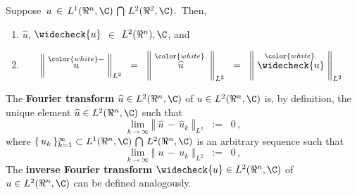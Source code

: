\vskip 0.5cm
\begin{theorem}
\mbox{}
\vskip 0.1cm
\noindent
Suppose \,$u \,\in\, L^{1}(\Re^{n},\C) \,\bigcap\, L^{2}(\Re^{2},\C)$.\,
Then,
\begin{enumerate}
\item
	$\widehat{u}$, $\widecheck{u}$ $\in$ $L^{2}(\Re^{n}),\C$, and
\item
	\begin{equation*}
	\left\Vert\;\overset{{\color{white}-}}{u}\;\right\Vert_{L^{2}}
	\;\; = \;\;
		\left\Vert\;\overset{{\color{white}.}}{\widehat{u}}\;\right\Vert_{L^{2}}
	\;\; = \;\;
		\left\Vert\;\overset{{\color{white}.}}{\widecheck{u}}\;\right\Vert_{L^{2}}
	\end{equation*}
\end{enumerate}
\end{theorem}

\vskip 0.5cm
\begin{definition}
\mbox{}
\vskip 0.1cm
\noindent
The \textbf{Fourier transform} $\widehat{u} \in L^{2}(\Re^{n},\C)$ of $u \in L^{2}(\Re^{n},\C)$ is, by definition,
the unique element $\widehat{u} \in L^{2}(\Re^{n},\C)$ such that
\begin{equation*}
\underset{k \rightarrow\infty}{\lim} \left\Vert\; \widehat{u} \,-\, \widehat{u}_{k} \;\right\Vert_{L^{2}}  \;\; := \;\;0\,,
\end{equation*}
where $\{\,u_{k}\,\}_{k=1}^{\infty} \subset L^{1}(\Re^{n},\C) \,\bigcap\, L^{2}(\Re^{n},\C)$
is an arbitrary sequence such that
\begin{equation*}
\underset{k \rightarrow\infty}{\lim} \left\Vert\; u \,-\, u_{k} \;\right\Vert_{L^{2}}  \;\; := \;\;0\,,
\end{equation*}
The \textbf{inverse Fourier transform} $\widecheck{u} \in L^{2}(\Re^{n},\C)$ of $u \in L^{2}(\Re^{n},\C)$ can be defined analogously.
\end{definition}

